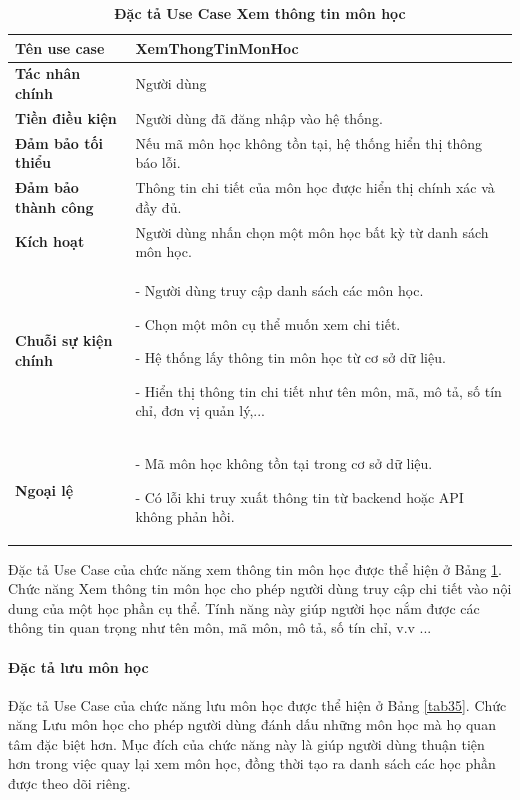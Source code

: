 \documentclass{article}
\begin{document}
	\begin{table}[H]
		\centering
		\caption [Đặc tả Use Case Xem thông tin môn học]{\bfseries \fontsize{12pt}{0pt}\selectfont Đặc tả Use Case Xem thông tin môn học}
		\label{tab34}
		\begin{tabular}{|p{4cm}|p{10.5cm}|}
			\hline
			\textbf{Tên use case} & XemThongTinMonHoc \\
			\hline
			\textbf{Tác nhân chính} & Người dùng \\
			\hline
			\textbf{Tiền điều kiện} & Người dùng đã đăng nhập vào hệ thống. \\
			\hline
			\textbf{Đảm bảo tối thiểu} & Nếu mã môn học không tồn tại, hệ thống hiển thị thông báo lỗi. \\
			\hline
			\textbf{Đảm bảo thành công} & Thông tin chi tiết của môn học được hiển thị chính xác và đầy đủ. \\
			\hline
			\textbf{Kích hoạt} & Người dùng nhấn chọn một môn học bất kỳ từ danh sách môn học. \\
			\hline
			\textbf{Chuỗi sự kiện chính} &
			- Người dùng truy cập danh sách các môn học.
			
			- Chọn một môn cụ thể muốn xem chi tiết.
			
			- Hệ thống lấy thông tin môn học từ cơ sở dữ liệu.
			
			- Hiển thị thông tin chi tiết như tên môn, mã, mô tả, số tín chỉ, đơn vị quản lý,...
			\\
			\hline
			\textbf{Ngoại lệ} &
			- Mã môn học không tồn tại trong cơ sở dữ liệu.
			
			- Có lỗi khi truy xuất thông tin từ backend hoặc API không phản hồi.
			\\
			\hline
		\end{tabular}
	\end{table}
	
	Đặc tả Use Case của chức năng xem thông tin môn học được thể hiện ở Bảng \ref{tab34}. Chức năng Xem thông tin môn học cho phép người dùng truy cập chi tiết vào nội dung của một học phần cụ thể. Tính năng này giúp người học nắm được các thông tin quan trọng như tên môn, mã môn, mô tả, số tín chỉ, v.v ... 
	
	\paragraph{Đặc tả lưu môn học} \mbox{}
	
	Đặc tả Use Case của chức năng lưu môn học được thể hiện ở Bảng \ref{tab35}. Chức năng Lưu môn học cho phép người dùng đánh dấu những môn học mà họ quan tâm đặc biệt hơn. Mục đích của chức năng này là giúp người dùng thuận tiện hơn trong việc quay lại xem môn học, đồng thời tạo ra danh sách các học phần được theo dõi riêng.
	
\end{document}
